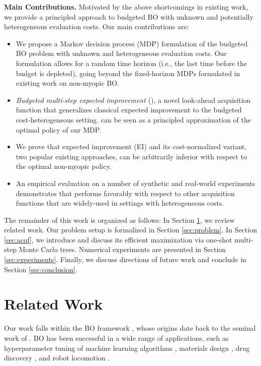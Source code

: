 \textbf{Main Contributions.} Motivated by the above shortcomings in existing work, we provide a principled approach to budgeted BO with unknown and potentially heterogeneous evaluation costs. Our main contributions are:
\begin{itemize}[itemsep=2pt,topsep=1pt,leftmargin=20pt]
\item We propose a Markov decision process (MDP) formulation of the budgeted BO problem with unknown and heterogeneous evaluation costs. Our formulation allows for a random time horizon (i.e., the last time before the budget is depleted),  %
going beyond the fixed-horizon MDPs formulated in existing work on non-myopic BO.
%
\item %
\emph{Budgeted multi-step expected improvement} (\BMSEI{}), a novel look-ahead acquisition function that generalizes classical expected improvement to the budgeted cost-heterogeneous setting. \BMSEI{} can be seen as a principled approximation of the optimal policy of our MDP. %
%
\item We prove that expected improvement (EI) and its cost-normalized variant, two popular existing approaches, can be arbitrarily inferior with respect to the optimal non-myopic policy.
%
\item An empirical evaluation on a number of synthetic and real-world experiments demonstrates that \BMSEI{} performs favorably with respect to other acquisition functions that are widely-used in settings with heterogeneous costs.
\end{itemize}

The remainder of this work is organized as follows: In Section \ref{sec:background}, we review related work. Our problem setup is formalized in Section \ref{sec:problem}. In Section \ref{sec:acqf}, we introduce %
\BMSEI{} and discuss its efficient maximization via one-shot multi-step Monte Carlo trees. Numerical experiments are presented in Section \ref{sec:experiments}. Finally, we discuss directions of future work and conclude in Section \ref{sec:conclusion}.



\section{Related Work}
\label{sec:background}
Our work falls within the BO framework \citep{frazier2018tutorial}, whose origins date back to the seminal work of \cite{kushner1964new}. BO has been successful in a wide range of applications, such as hyperparameter tuning of machine learning algorithms \citep{Snoek2012ML, wu2020practical}, materials design \citep{zhang2020bayesian}, drug discovery \citep{griffiths2020constrained}, and robot locomotion \citep{calandra2016bayesian, wang2017max}. 

